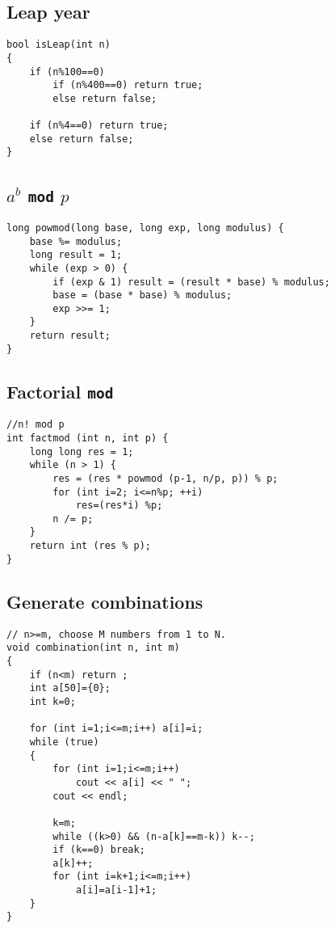 \documentclass[a4paper]{article}
\begin{document}
\subsection{Leap year}

\begin{verbatim}
bool isLeap(int n)
{
	if (n%100==0)
		if (n%400==0) return true;
		else return false;

	if (n%4==0) return true;
	else return false;
}
\end{verbatim}

\subsection{$a^b$ \texttt{mod} $p$}
\begin{verbatim}
long powmod(long base, long exp, long modulus) {
	base %= modulus;
	long result = 1;
	while (exp > 0) {
		if (exp & 1) result = (result * base) % modulus;
		base = (base * base) % modulus;
		exp >>= 1;
	}
	return result;
}
\end{verbatim}

\subsection{Factorial \texttt{mod}}

\begin{verbatim}
//n! mod p
int factmod (int n, int p) {
	long long res = 1;
	while (n > 1) {
		res = (res * powmod (p-1, n/p, p)) % p;
		for (int i=2; i<=n%p; ++i)
			res=(res*i) %p;
		n /= p;
	}
	return int (res % p);
}
\end{verbatim}

\subsection{Generate combinations}
\begin{verbatim}
// n>=m, choose M numbers from 1 to N.
void combination(int n, int m)
{
	if (n<m) return ;
	int a[50]={0};
	int k=0;

	for (int i=1;i<=m;i++) a[i]=i;
	while (true)
	{
		for (int i=1;i<=m;i++)
			cout << a[i] << " ";
		cout << endl;

		k=m;
		while ((k>0) && (n-a[k]==m-k)) k--;
		if (k==0) break;
		a[k]++;
		for (int i=k+1;i<=m;i++)
			a[i]=a[i-1]+1;
	}
}
\end{verbatim}
\end{document}
